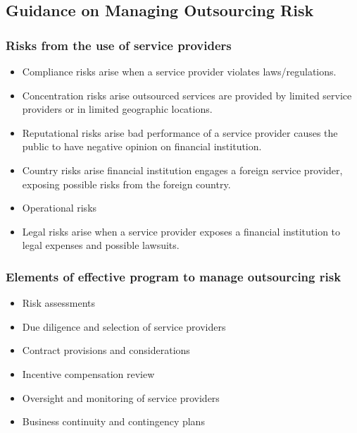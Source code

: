 \subsection{ Guidance on Managing Outsourcing Risk}


\subsubsection{Risks from the use of service providers }
\begin{itemize}
\item Compliance risks arise when a service provider violates laws/regulations.
\item Concentration risks arise outsourced services are provided by limited service providers or in limited geographic locations.
\item Reputational risks arise bad performance of a service provider causes the public to have negative opinion on financial institution.
\item Country risks arise financial institution engages a foreign service provider, exposing possible risks from the foreign country.
\item Operational risks
\item Legal risks arise when a service provider exposes a financial institution to legal expenses and possible lawsuits.
\end{itemize}



\subsubsection{Elements of effective program to manage outsourcing risk }
\begin{itemize}
\item Risk assessments
\item Due diligence and selection of service providers
\item Contract provisions and considerations
\item Incentive compensation review
\item Oversight and monitoring of service providers
\item Business continuity and contingency plans

\end{itemize}



